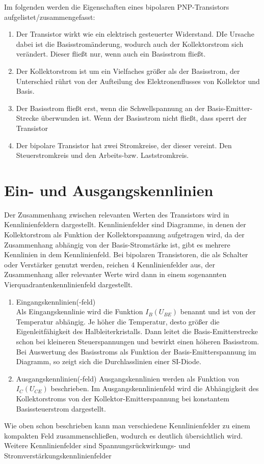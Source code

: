 Im folgenden werden die Eigenschaften eines bipolaren PNP-Transistors
aufgelistet/zusammengefasst:
\begin{enumerate} 
\item Der Transistor wirkt wie ein elektrisch gesteuerter Widerstand. DIe Ursache dabei ist die
Basisstromänderung, wodurch auch der Kollektorstrom sich verändert. Dieser fließt nur,
wenn auch ein Basisstrom fließt.
\item Der Kollektorstrom ist um ein Vielfaches größer als der Basisstrom, der Unterschied
rührt von der Aufteilung des Elektronenflusses von Kollektor und Basis.
\item Der Basisstrom fließt erst, wenn die Schwellspannung an der Basis-Emitter-Strecke
überwunden ist. Wenn der Basisstrom nicht fließt, dass sperrt der Transistor
\item Der bipolare Transistor hat zwei Stromkreise, der dieser vereint. Den Steuerstromkreis
und den Arbeits-bzw. Laststromkreis.
\end{enumerate}
\section{Ein- und Ausgangskennlinien}
Der Zusammenhang zwischen relevanten Werten des Transistors wird in Kennlinienfeldern dargestellt. 
Kennlinienfelder sind Diagramme, in denen der Kollektorstrom als Funktion der Kollektorspannung aufgetragen wird, da der Zusammenhang abhängig von der Basis-Stromstärke ist, gibt es mehrere Kennlinien in dem Kennlinienfeld. Bei bipolaren Transistoren, die als Schalter oder Verst\"arker genutzt werden, reichen 4 Kennlinienfelder aus, der Zusammenhang aller relevanter Werte wird dann in einem sogenannten Vierquadrantenkennlinienfeld dargestellt. \\
\begin{enumerate} 
\item Eingangskennlinien(-feld)\\
Als Eingangskennlinie wird die Funktion $I_B(U_{BE})$ benannt und ist von der Temperatur abhängig. Je höher die Temperatur, desto  größer die Eigenleitfähigkeit des Halbleiterkristalls. Dann leitet die Basis-Emitterstrecke schon bei kleineren Steuerspannungen und bewirkt einen höheren Basisstrom. \\
Bei Auswertung des Basisstroms als Funktion der Basis-Emitterspannung im Diagramm, so zeigt sich die Durchlasslinien einer SI-Diode. 
\item Ausgangskennlinien(-feld)
Ausgangskennlinien werden als Funktion von $I_C(U_{CE})$ beschrieben. Im Ausgangskennlinienfeld wird die Abhängigkeit des Kollektorstroms von der Kollektor-Emitterspannung bei konstantem Basissteuerstrom dargestellt. 
\end{enumerate}
Wie oben schon beschrieben kann man verschiedene Kennlinienfelder zu einem kompakten Feld zusammenschließen, wodurch es deutlich übersichtlich wird. Weitere Kennlinienfelder sind Spannungsrückwirkungs- und Stromverstärkungskennlinienfelder
